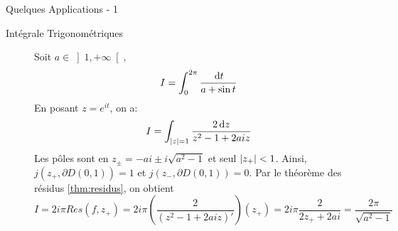 \documentclass{cours}
\begin{document}
\begin{propositionfr}
	{Quelques Applications - 1}{}
	\begin{description}
        
		\item[Intégrale Trigonométriques] Soit $a \in \left]1, + \infty\right[$, 
			\begin{equation*}
				I = \int_{0}^{2\pi} \frac{{\rm \, d} t}{a + \sin t}
			\end{equation*}
			En posant $z = e^{it}$, on a:
			\begin{equation*}
				I = \int_{\left|z\right| = 1}\frac{2 {\rm \, d} z}{z^{2} - 1 + 2aiz}
			\end{equation*}
			Les pôles sont en $z_{\pm} = - ai \pm i\sqrt{a^{2} - 1}$ et seul $\left|z_{+}\right| < 1$.
			Ainsi, $j\left(z_{+}, \partial D\left(0, 1\right)\right) = 1$ et $j\left(z_{-}, \partial D\left(0, 1\right)\right) = 0$.
			Par le théorème des résidus \ref{thm:residus}, on obtient
			\begin{equation*}
				I = 2i\pi Res\left(f, z_{+}\right) = 2i\pi\left(\frac{2}{\left(z^{2} - 1 + 2aiz\right)'}\right)\left(z_{+}\right) = 2i\pi \frac{2}{2z_{+} + 2ai} = \frac{2\pi}{\sqrt{a^{2} - 1}}
			\end{equation*}


\end{description}
\end{propositionfr}
\end{document}
